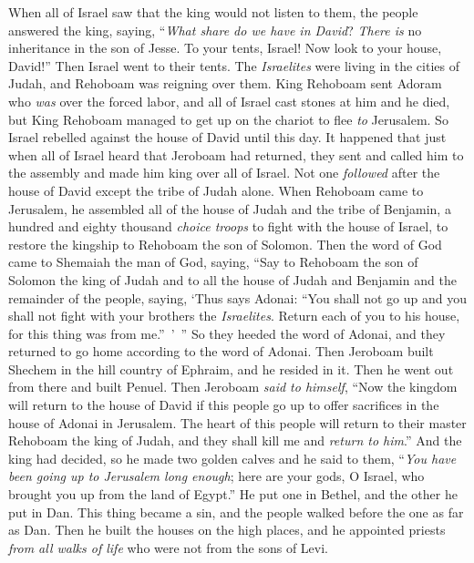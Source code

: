 \begin{biblechapter}
\verse When all of Israel saw that the king would not listen to them, the people answered the king, saying, “\textit{What share do we have in David}? \textit{There is} no inheritance in the son of Jesse. To your tents, Israel! Now look to your house, David!” Then Israel went to their tents.
\verse The \textit{Israelites} were living in the cities of Judah, and Rehoboam was reigning over them.
\verse King Rehoboam sent Adoram who \textit{was} over the forced labor, and all of Israel cast stones at him and he died, but King Rehoboam managed to get up on the chariot to flee \textit{to} Jerusalem.
\verse So Israel rebelled against the house of David until this day.
 It happened that just when all of Israel heard that Jeroboam had returned, they sent and called him to the assembly and made him king over all of Israel. Not one \textit{followed} after the house of David except the tribe of Judah alone.
\verse When Rehoboam came to Jerusalem, he assembled all of the house of Judah and the tribe of Benjamin, a hundred and eighty thousand \textit{choice troops} to fight with the house of Israel, to restore the kingship to Rehoboam the son of Solomon.
\verse Then the word of God came to Shemaiah the man of God, saying,
\verse “Say to Rehoboam the son of Solomon the king of Judah and to all the house of Judah and Benjamin and the remainder of the people, saying,
\verse ‘Thus says Adonai: “You shall not go up and you shall not fight with your brothers the \textit{Israelites}. Return each of you to his house, for this thing was from me.” ’ ” So they heeded the word of Adonai, and they returned to go home according to the word of Adonai.
 Then Jeroboam built Shechem in the hill country of Ephraim, and he resided in it. Then he went out from there and built Penuel.
\verse Then Jeroboam \textit{said to himself}, “Now the kingdom will return to the house of David
\verse if this people go up to offer sacrifices in the house of Adonai in Jerusalem. The heart of this people will return to their master Rehoboam the king of Judah, and they shall kill me and \textit{return to him}.”
\verse And the king had decided, so he made two golden calves and he said to them, “\textit{You have been going up to Jerusalem long enough}; here are your gods, O Israel, who brought you up from the land of Egypt.”
\verse He put one in Bethel, and the other he put in Dan.
\verse This thing became a sin, and the people walked before the one as far as Dan.
\verse Then he built the houses on the high places, and he appointed priests \textit{from all walks of life} who were not from the sons of Levi.

\end{biblechapter}
